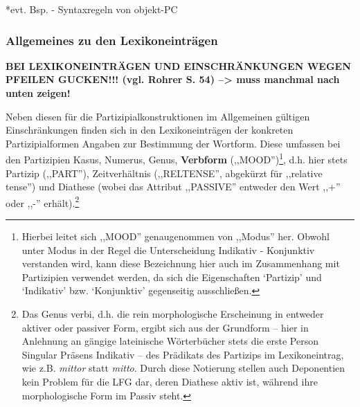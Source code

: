\documentclass[12pt,a4paper]{article}
\begin{document}






*evt. Bsp. - Syntaxregeln von objekt-PC

\subsubsection{Allgemeines zu den Lexikoneinträgen}

\textbf{BEI LEXIKONEINTRÄGEN UND EINSCHRÄNKUNGEN WEGEN PFEILEN GUCKEN!!! (vgl. Rohrer S. 54) --> muss manchmal nach unten zeigen!}

Neben diesen für die Partizipialkonstruktionen im Allgemeinen gültigen Einschränkungen finden sich in den Lexikoneinträgen der konkreten Partizipialformen Angaben zur Bestimmung der Wortform. Diese umfassen bei den Partizipien Kasus, Numerus, Genus, \textbf{Verbform} (,,MOOD'')\footnote{Hierbei leitet sich ,,MOOD'' genaugenommen von ,,Modus'' her. Obwohl unter Modus in der Regel die Unterscheidung Indikativ - Konjunktiv verstanden wird, kann diese Bezeichnung hier 	auch im Zusammenhang mit Partizipien verwendet werden, da sich die Eigenschaften `Partizip' und `Indikativ' bzw. `Konjunktiv' gegenseitig ausschließen.}, d.h. hier stets Partizip (,,PART''), Zeitverhältnis (,,RELTENSE'', abgekürzt für ,,relative tense'') und Diathese (wobei das Attribut ,,PASSIVE'' entweder den Wert ,,+'' oder ,,-'' erhält).\footnote{Das Genus verbi, d.h. die rein morphologische Erscheinung in entweder aktiver oder passiver Form, ergibt sich aus der Grundform -- hier in Anlehnung an gängige lateinische Wörterbücher stets die erste Person Singular Präsens Indikativ -- des Prädikats des Partizips im Lexikoneintrag, wie z.B. \textit{mittor} statt \textit{mitto}. Durch diese Notierung stellen auch Deponentien kein Problem für die LFG dar, deren Diathese aktiv ist, während ihre morphologische Form im Passiv steht.} \\
\end{document}
